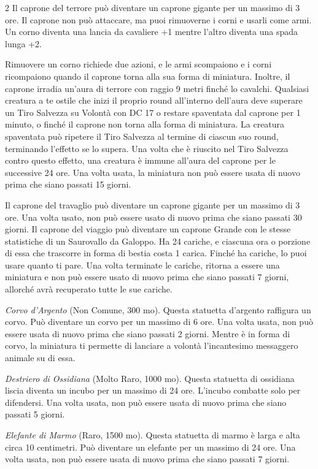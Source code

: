 \begin{multicols}{2}
Il caprone del terrore può diventare un caprone gigante per un massimo di 3 ore. Il caprone non può attaccare, ma puoi rimuoverne i corni e usarli come armi. Un corno diventa una lancia da cavaliere +1 mentre l'altro diventa una spada lunga +2.

Rimuovere un corno richiede due azioni, e le armi scompaiono e i corni ricompaiono quando il caprone torna alla sua forma di miniatura. Inoltre, il caprone irradia un'aura di terrore con raggio 9 metri finché lo cavalchi. Qualsiasi creatura a te ostile che inizi il proprio round all'interno dell'aura deve superare un Tiro Salvezza su Volontà con DC 17 o restare
spaventata dal caprone per 1 minuto, o finché il caprone non torna alla forma di miniatura. La creatura spaventata può ripetere il Tiro Salvezza al termine di ciascun suo round, terminando l'effetto se lo supera. Una volta che è riuscito nel Tiro Salvezza contro questo effetto, una creatura è immune all'aura del caprone per le successive 24 ore. Una volta usata, la miniatura non può essere usata di nuovo prima che siano passati 15 giorni.

Il caprone del travaglio può diventare un caprone gigante per un massimo di 3 ore. Una volta usato, non può essere usato di nuovo prima che siano passati 30 giorni.
Il caprone del viaggio può diventare un caprone Grande con le stesse statistiche di un Saurovallo da Galoppo. Ha 24 cariche, e ciascuna ora o porzione di essa che trascorre in forma di bestia costa 1 carica. Finché ha cariche, lo puoi usare quanto ti pare. Una volta terminate le cariche, ritorna a essere una miniatura e non può essere usato di nuovo prima che siano passati 7 giorni, allorché avrà recuperato tutte le sue cariche.

\emph{Corvo d'Argento} (Non Comune, 300 mo). Questa statuetta d'argento raffigura un corvo. Può diventare un corvo per un massimo di 6 ore. Una volta usata, non può essere usata di nuovo prima che siano passati 2 giorni. Mentre è in forma di corvo, la miniatura ti permette di lanciare a volontà l'incantesimo messaggero animale su di essa.

\emph{Destriero di Ossidiana} (Molto Raro, 1000 mo). Questa statuetta di ossidiana liscia diventa un incubo per un massimo di 24 ore. L'incubo combatte solo per difendersi. Una volta usata, non può essere usata di nuovo prima che siano passati 5 giorni.

\emph{Elefante di Marmo} (Raro, 1500 mo). Questa statuetta di marmo è larga e alta circa 10 centimetri. Può diventare un elefante per un massimo di 24 ore. Una volta usata, non può essere usata di nuovo prima che siano passati 7 giorni.


\end{multicols}
